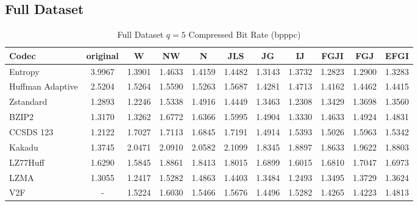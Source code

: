\documentclass{article}
\begin{document}
\subsection{Full Dataset}
\begin{table}[h!]
\centering
\caption{Full Dataset $q=5$ Compressed Bit Rate (bpppc)}
\begin{tabular}{|l|cccccccccc|}
\hline
Codec &  original &      W &     NW &      N &    JLS &     JG &     IJ &   FGJI &    FGJ &   EFGI \\
\hline
Entropy & 3.9967 & 1.3901 & 1.4633 & 1.4159 & 1.4482 & 1.3143 & 1.3732 & 1.2823 & 1.2900 & 1.3283 \\
\hline
Huffman Adaptive &    2.5204 & 1.5264 & 1.5590 & 1.5263 & 1.5687 & 1.4281 & 1.4713 & 1.4162 & 1.4462 & 1.4415 \\
Zstandard        &    1.2893 & 1.2246 & 1.5338 & 1.4916 & 1.4449 & 1.3463 & 1.2308 & 1.3429 & 1.3698 & 1.3560 \\
BZIP2            &    1.3170 & 1.3262 & 1.6772 & 1.6366 & 1.5995 & 1.4904 & 1.3330 & 1.4633 & 1.4924 & 1.4831 \\
CCSDS 123        &    1.2122 & 1.7027 & 1.7113 & 1.6845 & 1.7191 & 1.4914 & 1.5393 & 1.5026 & 1.5963 & 1.5342 \\
Kakadu           &    1.3745 & 2.0471 & 2.0910 & 2.0582 & 2.1099 & 1.8345 & 1.8897 & 1.8633 & 1.9622 & 1.8803 \\
LZ77Huff         &    1.6290 & 1.5845 & 1.8861 & 1.8413 & 1.8015 & 1.6899 & 1.6015 & 1.6810 & 1.7047 & 1.6973 \\
LZMA             &    1.3055 & 1.2417 & 1.5282 & 1.4863 & 1.4403 & 1.3484 & 1.2493 & 1.3495 & 1.3729 & 1.3624 \\
V2F              &   - & 1.5224 & 1.6030 & 1.5466 & 1.5676 & 1.4496 & 1.5282 & 1.4265 & 1.4223 & 1.4813 \\
\hline
\end{tabular}
\end{table}
\end{document}

